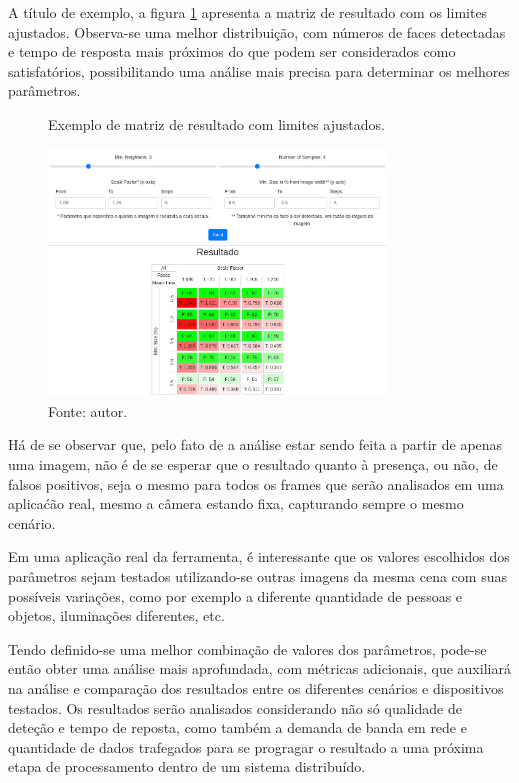 A título de exemplo, a figura \ref{fig:matrizResultado2} apresenta a matriz de resultado com os limites ajustados. Observa-se uma melhor distribuição, com números de faces detectadas e tempo de resposta mais próximos do que podem ser considerados como satisfatórios, possibilitando uma análise mais precisa para determinar os melhores parâmetros.

\begin{figure}[h]
    \centering
    \caption[Exemplo de matriz de resultado com limites ajustados.]{Exemplo de matriz de resultado com limites ajustados.}
    \includegraphics[width=0.8\textwidth]{Cap3_Desenvolvimento/Figures/exemplo_resultado_matriz_2.jpg}
    \caption*{Fonte: autor.}
    \label{fig:matrizResultado2}
\end{figure}

Há de se observar que, pelo fato de a análise estar sendo feita a partir de apenas uma imagem, não é de se esperar que o resultado quanto à presença, ou não, de falsos positivos, seja o mesmo para todos os frames que serão analisados em uma aplicaćão real, mesmo a câmera estando fixa, capturando sempre o mesmo cenário.

Em uma aplicação real da ferramenta, é interessante que os valores escolhidos dos parâmetros sejam testados utilizando-se outras imagens da mesma cena com suas possíveis variações, como por exemplo a diferente quantidade de pessoas e objetos, iluminações diferentes, etc.

Tendo definido-se uma melhor combinação de valores dos parâmetros, pode-se então obter uma análise mais aprofundada, com métricas adicionais, que auxiliará na análise e comparação dos resultados entre os diferentes cenários e dispositivos testados. Os resultados serão analisados considerando não só qualidade de deteção e tempo de reposta, como também a demanda de banda em rede e quantidade de dados trafegados para se progragar o resultado a uma próxima etapa de processamento dentro de um sistema distribuído.

